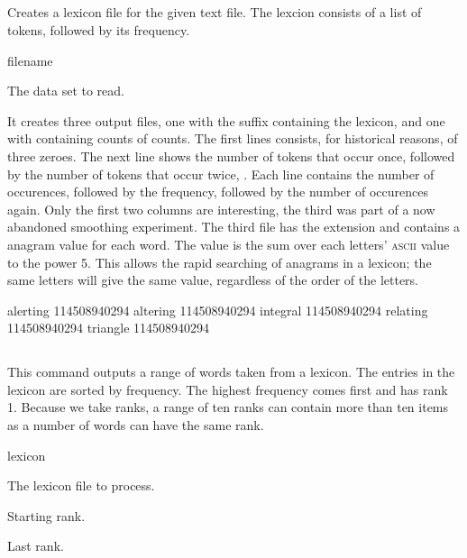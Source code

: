 \documentclass[a4paper,10pt,twoside]{report}
\begin{document}
\subsection{}

Creates a lexicon file for the given text file. The lexcion consists
of a list of tokens, followed by its frequency.

\begin{varlist}{filename}
\item[filename] The data set to read.
\end{varlist}

It creates three output files, one with the suffix 
containing the lexicon, and one with  containing counts of
counts. The first lines consists, for historical reasons, of three 
zeroes. The next line shows the number of tokens that occur once,
followed by the number of tokens that occur twice, \etc{}. Each line
contains the number of occurences, followed by the frequency, followed
by the number of occurences again. Only the first two columns are
interesting, the third was part of a now abandoned smoothing experiment.
The third file has the extension  and contains a
anagram value for each word. The value is the sum over each letters'
\textsc{ascii} value to the power 5. This allows the rapid searching
of anagrams in a lexicon; the same letters will give the same value,
regardless of the order of the letters.

\begin{wout}{}
alerting 114508940294
altering 114508940294
integral 114508940294
relating 114508940294
triangle 114508940294
\end{wout}

\subsection{}

This command outputs a range of words taken from a lexicon. The
entries in the lexicon are sorted by frequency. The highest frequency
comes first and has rank 1.  Because we take ranks, a range of ten
ranks can contain more than ten items as a number of words can have
the same rank.

\begin{varlist}{lexicon}
\item[lexicon] The lexicon file to process.
\item[n] Starting rank.
\item[m] Last rank.
\end{varlist}
\end{document}
